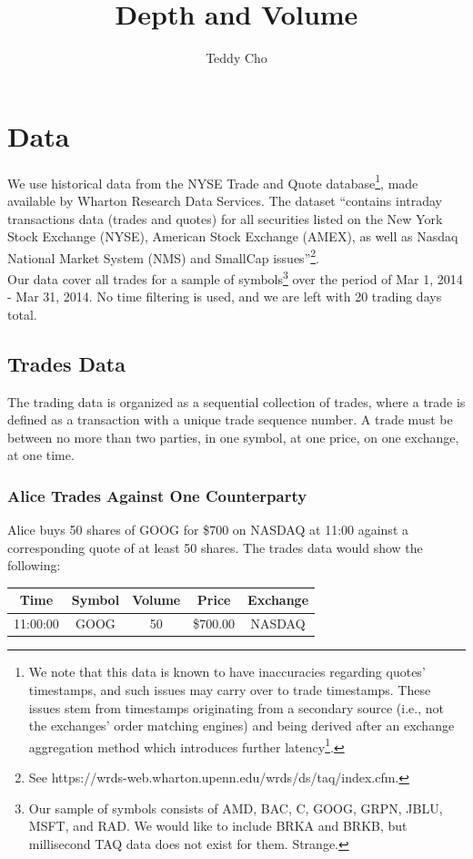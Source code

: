 \documentclass{article}
\begin{document}
\title{Depth and Volume} \author{Teddy Cho}

\maketitle
\vspace{.5pc}

\section{Data}
We use historical data from the NYSE Trade and Quote database\footnote{We note that this data is known to have inaccuracies regarding quotes' timestamps, and such issues may carry over to trade timestamps. These issues stem from timestamps originating from a secondary source (i.e., not the exchanges' order matching engines) and being derived after an exchange aggregation method which introduces further latency\footnote{See Budish, Cramton and Shim (2015) and Ding, Hanna and Hendershott (2014)}.}, made available by Wharton Research Data Services. The dataset ``contains intraday transactions data (trades and quotes) for all securities listed on the New York Stock Exchange (NYSE), American Stock Exchange (AMEX), as well as Nasdaq National Market System (NMS) and SmallCap issues''\footnote{See https://wrds-web.wharton.upenn.edu/wrds/ds/taq/index.cfm.}.\\

Our data cover all trades for a sample of symbols\footnote{Our sample of symbols consists of AMD, BAC, C, GOOG, GRPN, JBLU, MSFT, and RAD. We would like to include BRKA and BRKB, but millisecond TAQ data does not exist for them. Strange.} over the period of Mar 1, 2014 - Mar 31, 2014. No time filtering is used, and we are left with 20 trading days total.\\

\subsection{Trades Data}
The trading data is organized as a sequential collection of trades, where a trade is defined as a transaction with a unique trade sequence number. A trade must be between no more than two parties, in one symbol, at one price, on one exchange, at one time.\\

\subsubsection{Alice Trades Against One Counterparty}
Alice buys 50 shares of GOOG for \$700 on NASDAQ at 11:00 against a corresponding quote of at least 50 shares. The trades data would show the following:
\begin{center}
  \begin{tabular}{| c | c | c | c | c |}
    \hline
    Time & Symbol & Volume & Price & Exchange \\ \hline
    11:00:00 & GOOG & 50 & \$700.00 & NASDAQ \\
    \hline
  \end{tabular}
\end{center}
\end{document}
